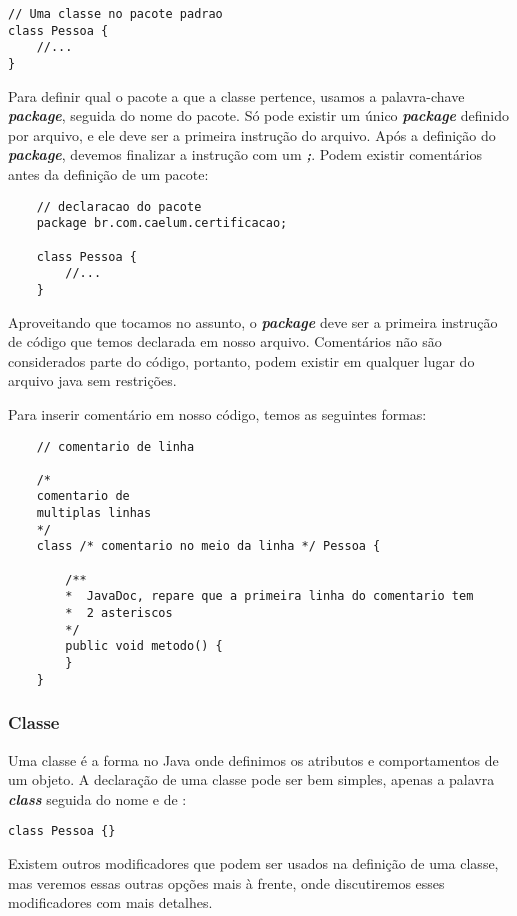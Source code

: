 \documentclass[12pt]{article}
\begin{document}
\begin{lstlisting}
// Uma classe no pacote padrao
class Pessoa {
	//...
}
\end{lstlisting}

Para definir qual o pacote a que a classe pertence, usamos a palavra-chave \textbf{\textit{package}}, seguida do nome do pacote. Só pode existir um único \textbf{\textit{package}} definido por arquivo, e ele deve ser a primeira instrução do arquivo. Após a definição do \textbf{\textit{package}}, devemos finalizar a instrução com um \textbf{\textit{;}}. Podem existir comentários antes da definição de um pacote:

\begin{lstlisting}
	// declaracao do pacote
	package br.com.caelum.certificacao;
	
	class Pessoa {
		//...
	}
\end{lstlisting}

Aproveitando que tocamos no assunto, o \textbf{\textit{package}} deve ser a primeira instrução de código que temos declarada em nosso arquivo. Comentários não são considerados parte do código, portanto, podem existir em qualquer lugar do arquivo java sem restrições.

\pagebreak
Para inserir comentário em nosso código, temos as seguintes formas:

\begin{lstlisting}
	// comentario de linha
	
	/*
	comentario de
	multiplas linhas
	*/
	class /* comentario no meio da linha */ Pessoa {
		
		/**
		*  JavaDoc, repare que a primeira linha do comentario tem
		*  2 asteriscos
		*/
		public void metodo() {
		}
	}
\end{lstlisting}

\subsubsection{Classe}

Uma classe é a forma no Java onde definimos os atributos e comportamentos de um objeto. A declaração de uma classe pode ser bem simples, apenas a palavra \textbf{\textit{class}} seguida do nome e de \textbf{\textit{{}}}:

\begin{lstlisting}
class Pessoa {}
\end{lstlisting}

Existem outros modificadores que podem ser usados na definição de uma classe, mas veremos essas outras opções mais à frente, onde discutiremos esses modificadores com mais detalhes.
\end{document}
